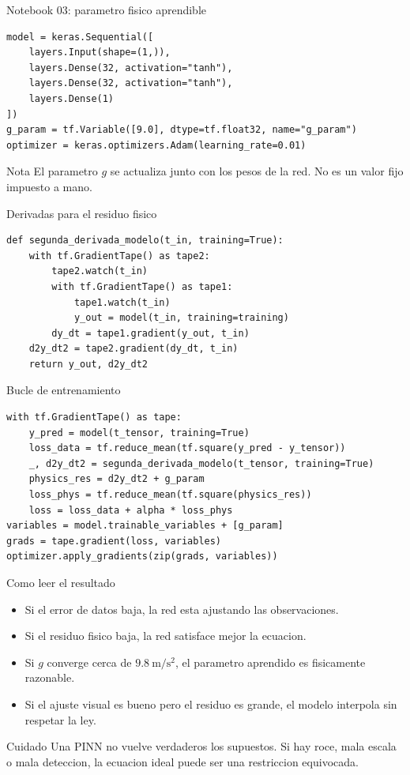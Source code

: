 \begin{frame}[fragile]{Notebook 03: parametro fisico aprendible}
\begin{verbatim}
model = keras.Sequential([
    layers.Input(shape=(1,)),
    layers.Dense(32, activation="tanh"),
    layers.Dense(32, activation="tanh"),
    layers.Dense(1)
])
g_param = tf.Variable([9.0], dtype=tf.float32, name="g_param")
optimizer = keras.optimizers.Adam(learning_rate=0.01)
\end{verbatim}
\begin{alertblock}{Nota}
El parametro $g$ se actualiza junto con los pesos de la red. No es un valor fijo impuesto a mano.
\end{alertblock}
\end{frame}

\begin{frame}[fragile]{Derivadas para el residuo fisico}
\begin{verbatim}
def segunda_derivada_modelo(t_in, training=True):
    with tf.GradientTape() as tape2:
        tape2.watch(t_in)
        with tf.GradientTape() as tape1:
            tape1.watch(t_in)
            y_out = model(t_in, training=training)
        dy_dt = tape1.gradient(y_out, t_in)
    d2y_dt2 = tape2.gradient(dy_dt, t_in)
    return y_out, d2y_dt2
\end{verbatim}
\end{frame}

\begin{frame}[fragile]{Bucle de entrenamiento}
\begin{verbatim}
with tf.GradientTape() as tape:
    y_pred = model(t_tensor, training=True)
    loss_data = tf.reduce_mean(tf.square(y_pred - y_tensor))
    _, d2y_dt2 = segunda_derivada_modelo(t_tensor, training=True)
    physics_res = d2y_dt2 + g_param
    loss_phys = tf.reduce_mean(tf.square(physics_res))
    loss = loss_data + alpha * loss_phys
variables = model.trainable_variables + [g_param]
grads = tape.gradient(loss, variables)
optimizer.apply_gradients(zip(grads, variables))
\end{verbatim}
\end{frame}

\begin{frame}{Como leer el resultado}
\begin{itemize}
    \item Si el error de datos baja, la red esta ajustando las observaciones.
    \item Si el residuo fisico baja, la red satisface mejor la ecuacion.
    \item Si $g$ converge cerca de $9.8~\mathrm{m/s^2}$, el parametro aprendido es fisicamente razonable.
    \item Si el ajuste visual es bueno pero el residuo es grande, el modelo interpola sin respetar la ley.
\end{itemize}
\begin{alertblock}{Cuidado}
Una PINN no vuelve verdaderos los supuestos. Si hay roce, mala escala o mala deteccion, la ecuacion ideal puede ser una restriccion equivocada.
\end{alertblock}
\end{frame}

